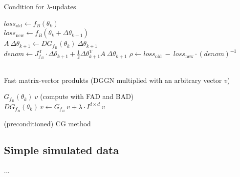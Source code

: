 \documentclass[conference]{IEEEtran}
\begin{document}
\begin{algorithm}
	\caption{Condition for $\lambda$-updates}\label{alg:three}
	$loss_{\mathrm{old}}\gets f_{B}(\theta_{k})$\\
	$loss_{\mathrm{new}}\gets f_{B}(\theta_{k}+\Delta\theta_{k+1})$\\
	$A\:\Delta\theta_{k+1}\gets DG_{f_{B}}(\theta_{k})\:\Delta\theta_{k+1}$\\
	$denom \gets J_{f_{B}}^{\mathrm{T}}\cdot\Delta\theta_{k+1} + \frac{1}{2}\Delta\theta_{k+1}^{\mathrm{T}}A\:\Delta\theta_{k+1}$
	$\rho\gets loss_{\mathrm{old}}\:-\:loss_{\mathrm{new}}\cdot(denom)^{-1}$\\
	\text{}\\
	\Output{$\lambda$}
\end{algorithm}

\begin{algorithm}
	\caption{Fast matrix-vector produkts (DGGN multiplied with an arbitrary vector $v$)}\label{alg:four}
	$G_{f_{B}}(\theta_{k})\:v$ (compute with FAD and BAD)\\
	$DG_{f_{B}}(\theta_{k})\: v \gets G_{f_{B}}\: v + \lambda\cdot I^{d\times d}\:v$\\
\end{algorithm}

\begin{algorithm}
	\caption{(preconditioned) CG method}\label{alg:five}
	
\end{algorithm}

\subsection{Simple simulated data}
...
\end{document}
